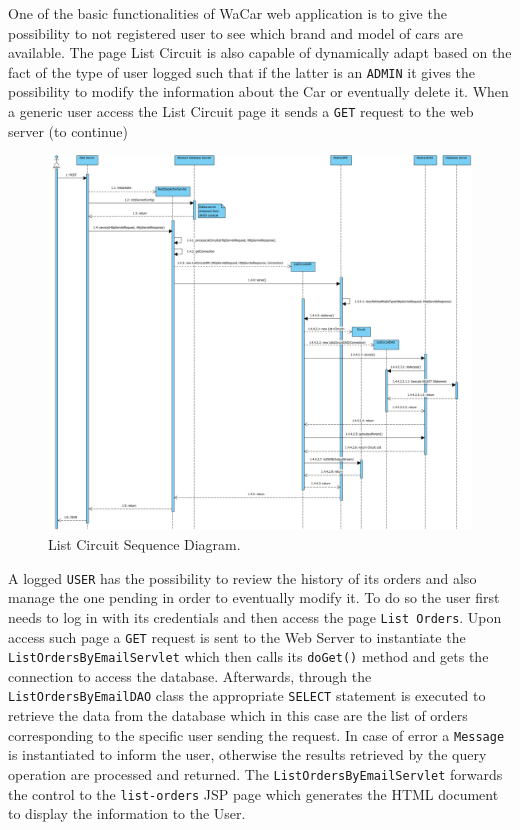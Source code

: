 One of the basic functionalities of WaCar web application is to give the possibility to not registered user to see which brand and model of cars are available.
The page List Circuit is also capable of dynamically adapt based on the fact of the type of user logged such that if the latter is an \texttt{ADMIN} it gives
the possibility to modify the information about the Car or eventually delete it. When a generic user access the List Circuit page it sends a \texttt{GET} request
to the web server (to continue)

\begin{figure}[h]
    \centering
    \includegraphics[width=\textwidth]{mockup/ListCircuitsSequenceDiagram}
    \caption{List Circuit Sequence Diagram.}
    \label{fig:listcircuit}
\end{figure}

A logged \texttt{USER} has the possibility to review the history of its orders and also manage the one pending in order to eventually modify it. To do so the user
first needs to log in with its credentials and then access the page \texttt{List Orders}. Upon access such page a \texttt{GET} request is sent to the Web Server
to instantiate the \texttt{ListOrdersByEmailServlet} which then calls its \texttt{doGet()} method and gets the connection to access the database. Afterwards, through
the \texttt{ListOrdersByEmailDAO} class the appropriate \texttt{SELECT} statement is executed to retrieve the data from the database which in this case are the list of orders
corresponding to the specific user sending the request. In case of error a \texttt{Message} is instantiated to inform the user, otherwise the results retrieved by the
query operation are processed and returned. The \texttt{ListOrdersByEmailServlet} forwards the control to the \texttt{list-orders} JSP page which generates the HTML document
to display the information to the User.

